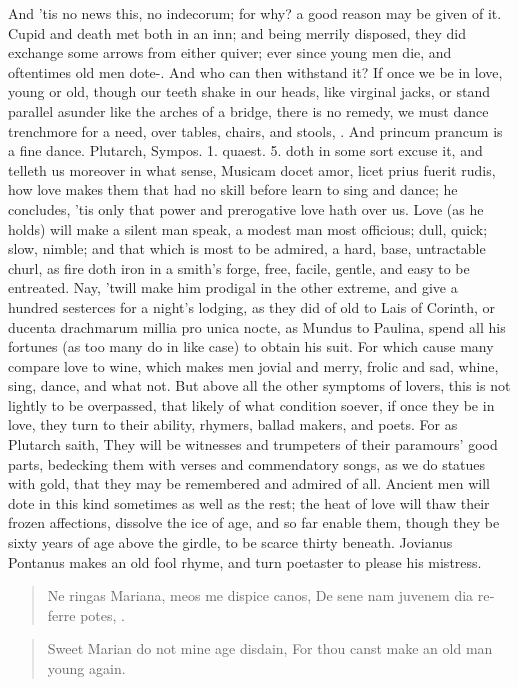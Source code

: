 And 'tis no news this, no indecorum; for why? a good reason may be
given of it. Cupid and death met both in an inn; and being merrily
disposed, they did exchange some arrows from either quiver; ever since
young men die, and oftentimes old men dote-. And who can then withstand it? If once we be in
love, young or old, though our teeth shake in our heads, like virginal
jacks, or stand parallel asunder like the arches of a bridge, there is
no remedy, we must dance trenchmore for a need, over tables, chairs,
and stools, \etc{}. And princum prancum is a fine dance. Plutarch, Sympos.
1. quaest. 5. doth in some sort excuse it, and telleth us moreover in
what sense, Musicam docet amor, licet prius fuerit rudis, how love
makes them that had no skill before learn to sing and dance; he
concludes, 'tis only that power and prerogative love hath over us.
Love (as he holds) will make a silent man speak, a modest man
most officious; dull, quick; slow, nimble; and that which is most to be
admired, a hard, base, untractable churl, as fire doth iron in a
smith's forge, free, facile, gentle, and easy to be entreated. Nay,
'twill make him prodigal in the other extreme, and give a hundred
sesterces for a night's lodging, as they did of old to Lais of Corinth,
or  ducenta drachmarum millia pro unica nocte, as Mundus to
Paulina, spend all his fortunes (as too many do in like case) to obtain
his suit. For which cause many compare love to wine, which makes men
jovial and merry, frolic and sad, whine, sing, dance, and what not.
But above all the other symptoms of lovers, this is not lightly to be
overpassed, that likely of what condition soever, if once they be in
love, they turn to their ability, rhymers, ballad makers, and poets.
For as Plutarch saith, They will be witnesses and trumpeters of
their paramours' good parts, bedecking them with verses and
commendatory songs, as we do statues with gold, that they may be
remembered and admired of all. Ancient men will dote in this kind
sometimes as well as the rest; the heat of love will thaw their frozen
affections, dissolve the ice of age, and so far enable them, though
they be sixty years of age above the girdle, to be scarce thirty
beneath. Jovianus Pontanus makes an old fool rhyme, and turn poetaster
to please his mistress.

\begin{latin}
\begin{verse}
Ne ringas Mariana, meos me dispice canos,
De sene nam juvenem dia referre potes, \etc{}.
\end{verse}
\end{latin}
\translationrule%
\begin{verse}%
Sweet Marian do not mine age disdain,
For thou canst make an old man young again.
\end{verse}%

